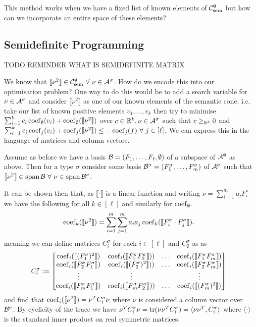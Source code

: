 This method works when we have a fixed list of known elements of
$\mathcal{C}_\mathrm{sem}^\emptyset$ but how can we incorporate an entire space of these elements?

\subsection{Semidefinite Programming}

TODO REMINDER WHAT IS SEMIDEFINITE MATRIX

We know that $\llbracket \nu^2 \rrbracket \in\mathcal{C}_\mathrm{sem}^\emptyset\ \forall\ \nu\in\mathcal{A}^\sigma$.
How do we encode this into our optimisation problem?
One way to do this would be to add a search variable for $\nu\in\mathcal{A}^\sigma$
and consider $\llbracket \nu^2 \rrbracket$ as one of our known elements of the semantic cone.
i.e. take our list of known positive elements $v_1, \dots, v_k$ then try to
minimise $\sum_{i=1}^kc_i\operatorname{coef}_\emptyset(v_i) + \operatorname{coef}_\emptyset(\llbracket\nu^2\rrbracket)$
over $c\in\mathbb{R}^k, \nu\in\mathcal{A}^\sigma$
such that
$c \geq_{\mathbb{R}^k} 0$ and $\sum_{i=1}^k c_i \operatorname{coef}_j(v_i) + \operatorname{coef}_j(\llbracket\nu^2\rrbracket) \leq -\operatorname{coef}_j(f)\ \forall\ j \in[\ell]$.
We can express this in the language of matrices and column vectors.

Assume as before we have a basis $\mathcal{B} = (F_1, \dots, F_\ell, \emptyset)$
of a subspace of $\mathcal{A}^\emptyset$ as above. Then for a type $\sigma$ consider some basis
$\mathcal{B}^\sigma=(F_1^\sigma, \dots, F_m^\sigma)$ of $\mathcal{A}^\sigma$ such
that $\llbracket \nu^2 \rrbracket \in \spanop\Bcl\ \forall\ \nu\in\spanop\Bcl^\sigma$.

It can be shown then that, as $\llbracket\cdot\rrbracket$ is a linear function and
writing $\nu=\sum_{i=1}^m a_i F_i^\sigma$ we have the following for all $k\in[\ell]$
and similarly for $\operatorname{coef}_\emptyset$.
\[
    \operatorname{coef}_k(\llbracket \nu^2 \rrbracket) = \sum_{i=1}^m\sum_{j=1}^m
    a_ia_j\operatorname{coef}_k(\llbracket F_i^\sigma\cdot F_j^\sigma\rrbracket).
\]
meaning we can define matrices $C^\sigma_i$ for each $i\in[\ell]$ and $C^\sigma_\emptyset$ as
as
\[
    C^\sigma_i :=
    \begin{bmatrix}
    \operatorname{coef}_i(\llbracket (F_1^\sigma)^2 \rrbracket)
    & \operatorname{coef}_i(\llbracket F_1^\sigma F_2^\sigma \rrbracket))
    & \dots
    & \operatorname{coef}_i(\llbracket F_1^\sigma F_m^\sigma \rrbracket)\\
    \operatorname{coef}_i(\llbracket F_2^\sigma F_1^\sigma \rrbracket)
    & \operatorname{coef}_i(\llbracket (F_2^\sigma)^2 \rrbracket))
    & \dots
    & \operatorname{coef}_i(\llbracket F_2^\sigma F_m^\sigma \rrbracket)\\
    \vdots & \vdots & & \vdots\\
    \operatorname{coef}_i(\llbracket F_m^\sigma F_1^\sigma \rrbracket)
    & \operatorname{coef}_i(\llbracket F_m^\sigma F_2^\sigma \rrbracket))
    & \dots
    & \operatorname{coef}_i(\llbracket (F_m^\sigma)^2 \rrbracket)\\
    \end{bmatrix}
\]
and find that $\operatorname{coef}_i(\llbracket \nu^2 \rrbracket) = \nu^T C^\sigma_i \nu$ where
$\nu$ is considered a column vector over $\mathcal{B}^\sigma$. By cyclicity
of the trace we have
$\nu^TC^\sigma_i\nu = \operatorname{tr}(\nu\nu^TC^\sigma_i)=\langle \nu\nu^T, C^\sigma_i\rangle$
where $\langle \cdot \rangle$ is the standard inner product on real symmetric matrices.

